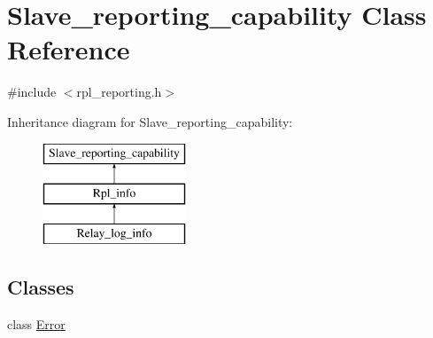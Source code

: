 \hypertarget{classSlave__reporting__capability}{}\section{Slave\+\_\+reporting\+\_\+capability Class Reference}
\label{classSlave__reporting__capability}


{\ttfamily \#include $<$rpl\+\_\+reporting.\+h$>$}

Inheritance diagram for Slave\+\_\+reporting\+\_\+capability\+:\begin{figure}[H]
\begin{center}
\leavevmode
\includegraphics[height=3.000000cm]{classSlave__reporting__capability}
\end{center}
\end{figure}
\subsection*{Classes}
\begin{DoxyCompactItemize}
\item 
class \mbox{\hyperlink{classSlave__reporting__capability_1_1Error}{Error}}
\end{DoxyCompactItemize}
